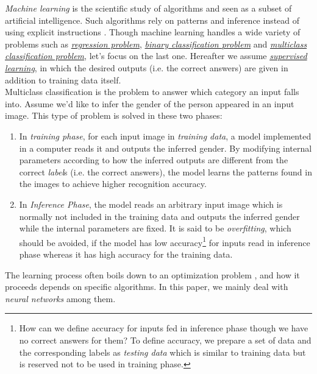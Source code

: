 \documentclass{article}
\theoremstyle{definition}
\begin{document}
{\it Machine learning} is the scientific study of algorithms and seen as a subset of artificial intelligence. Such algorithms rely on patterns and inference instead of using explicit instructions \cite{2}. Though machine learning handles a wide variety of problems such as \href{https://en.wikipedia.org/wiki/Regression\_analysis}{\it regression problem}, \href{https://en.wikipedia.org/wiki/Binary\_classification}{\it binary classification problem} and \href{https://en.wikipedia.org/wiki/Multiclass\_classification}{\it multiclass classification problem}, let's focus on the last one. Hereafter we assume \href{https://en.wikipedia.org/wiki/Supervised\_learning}{\it supervised learning}, in which the desired outputs (i.e. the correct answers) are given in addition to training data itself.\\

Multiclass classification is the problem to answer which category an input falls into. Assume we'd like to infer the gender of the person appeared in an input image. This type of problem is solved in these two phases:
\begin{enumerate}
\item
In {\it training phase}, for each input image in {\it training data}, a model implemented in a computer reads it and outputs the inferred gender. By modifying internal parameters according to how the inferred outputs are different from the correct {\it label}s (i.e. the correct answers), the model learns the patterns found in the images to achieve higher recognition accuracy.

\item
In {\it Inference Phase}, the model reads an arbitrary input image which is normally not included in the training data and outputs the inferred gender while the internal parameters are fixed. It is said to be {\it overfitting}, which should be avoided, if the model has low accuracy\footnote{How can we define accuracy for inputs fed in inference phase though we have no correct answers for them? To define accuracy, we prepare a set of data and the corresponding labels as {\it testing data} which is similar to training data but is reserved not to be used in training phase.} for inputs read in inference phase whereas it has high accuracy for the training data.
\end{enumerate}

The learning process often boils down to an optimization problem \cite{3}, and how it proceeds depends on specific algorithms. In this paper, we mainly deal with {\it neural networks} among them.
\end{document}
